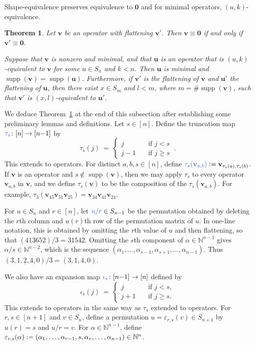 \documentclass[12pt,oneside,reqno]{amsart}
\newtheorem{theorem}{Theorem}[section]
\theoremstyle{definition}
\numberwithin{equation}{section}
\newcommand{\NN}{{\mathbb N}}
\newcommand{\qu}{{\mathbf u}}
\newcommand{\qv}{{\mathbf v}}
\newcommand{\bzero}{{\mathbf 0}}
\DeclareMathOperator{\supp}{supp}
\newcommand{\defcolor}[1]{{\color{RoyalBlue}#1}}
\begin{document}
Shape-equivalence preserves equivalence to $\bzero$ and for minimal operators, $(u,k)$-equivalence.


\begin{theorem}\label{Th:shape-equivalence}
  Let $\qv$ be an operator with flattening $\qv'$.
  Then $\qv\equiv\bzero$ if and only if $\qv'\equiv\bzero$.

  Suppose that $\qv$ is nonzero and minimal, and that $\qu$ is an operator that is $(u,k)$-equivalent to $\qv$
  for some $u\in S_n$ and $k<n$.
  Then $\qu$ is minimal and $\supp(\qv)=\supp(\qu)$.
  Furthermore, if $\qv'$ is the flattening of $\qv$ and $\qu'$ the flattening of $\qu$, then there exist
  $x\in S_m$ and $l<m$, where $m=\#\supp(\qv)$, such that $\qv'$ is $(x,l)$-equivalent to $\qu'$.
\end{theorem}


We deduce Theorem~\ref{Th:shape-equivalence} at the end of this subsection after establishing some preliminary lemmas and definitions.
Let $s\in[n]$.
Define the truncation map $\defcolor{\tau_s}\colon[n]\to[n{-}1]$ by
%
 \[
   \tau_s(j)\ =\ \left\{ \begin{array}{rcl} j&\ &\mbox{if }j<s\\ j{-}1&&\mbox{if } j\geq s\end{array}\right. \ .
 \]
%
This extends to operators.
For distinct $a,b,s\in[n]$, define $\defcolor{\tau_s(\qv_{a,b})}\vcentcolon=\qv_{\tau_s(a),\tau_s(b)}$.
If $\qv$ is an operator and $s\not\in\supp(\qv)$, then we may apply $\tau_s$ to every operator $\qv_{a,b}$ in $\qv$, and we
define $\tau_s(\qv)$ to be the composition of the $\tau_s(\qv_{a,b})$.
For example, $\tau_3(\qv_{45}\qv_{51}\qv_{25})=\qv_{34}\qv_{41}\qv_{24}$.

For $u\in S_n$ and $r\in[n]$, let $\defcolor{u/r}\in S_{n-1}$ be the permutation obtained by deleting the $r$th column and
$u(r)$th row of the permutation matrix of $u$.
In one-line notation, this is obtained by omitting the $r$th value of $u$ and then flattening, so that
$(41\underline{3}652)/3=31542$.
Omitting the $s$th component of  $\alpha\in\NN^{n-1}$ gives $\alpha/s\in\NN^{n-2}$, which is the sequence
$(\alpha_1,\dotsc,\alpha_{s-1},\alpha_{s+1},\dotsc,\alpha_{n-1})$.
Thus $(3,1,\underline{2},4,0)/3 = (3,1,4,0)$.

We also have an expansion map $\defcolor{\iota_s}\colon[n{-}1]\to[n]$ defined by
%
 \[
   \iota_s(j)\ =\ \left\{ \begin{array}{rcl} j&\ &\mbox{if }j<s,\\ j{+}1&&\mbox{if } j\geq s.\end{array}\right. 
 \]
%
This extends to operators in the same way as $\tau_s$ extended to operators.
For $r,s\in[n{+}1]$ and $v\in S_n$, define a permutation $u=\varepsilon_{r,s}(v)\in S_{n+1}$ by $u(r)=s$ and $u/r=v$.
For $\alpha\in\NN^{n-1}$, define $\varepsilon_{r,s}(\alpha)\vcentcolon=(\alpha_1,\dotsc,\alpha_{r{-}1},s,\alpha_r,\dotsc,\alpha_{n-1})\in\NN^{n}$.
\end{document}
